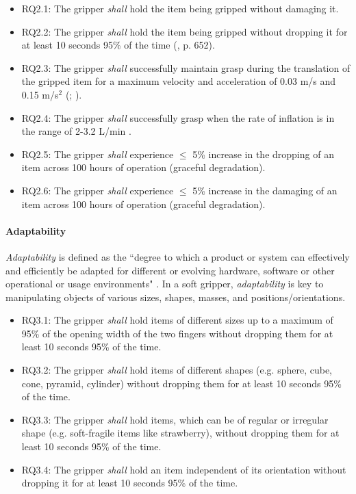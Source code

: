 \documentclass[letterpaper, 10 pt, conference]{ieeeconf}  %
\begin{document}
	\begin{itemize}
		\item RQ2.1: The gripper \emph{shall} hold the item being gripped without damaging it. 
		\item RQ2.2: The gripper \emph{shall} hold the item being gripped without dropping it for at least 10 seconds 95\% of the time (\cite{Sotiropoulos2018}, p. 652).
		\item RQ2.3: The gripper \emph{shall} successfully maintain grasp during the translation of the gripped item for a maximum velocity and acceleration of 0.03 m/s and 0.15 m/s$^2$ (\cite{Triantafyllou2019}; \cite{Cheng2021}).
		\item RQ2.4: The gripper \emph{shall} successfully grasp when the rate of inflation is in the range of 2-3.2 L/min \cite{DEWIN2022}.
		\item RQ2.5: The gripper \emph{shall} experience $\le$ 5\% increase in the dropping of an item across 100 hours of operation (graceful degradation). %
		\item RQ2.6: The gripper \emph{shall} experience $\le$ 5\% increase in the damaging of an item across 100 hours of operation (graceful degradation).  %
	\end{itemize}
	\paragraph{\textbf{Adaptability}} \label{adaptability}
	\emph{Adaptability} is defined as the ``degree to which a product or system can effectively and efficiently be adapted for different or evolving hardware, software or other operational or usage environments" \cite{ISO24765:2017}. In a soft gripper, \emph{adaptability} is key to manipulating objects of various sizes, shapes, masses, and positions/orientations. 
	\begin{itemize}
		\item RQ3.1: The gripper \emph{shall} hold items of different sizes up to a maximum of 95\% of the opening width of the two fingers without dropping them for at least 10 seconds 95\% of the time.
		\item RQ3.2: The gripper \emph{shall} hold items of different shapes (e.g. sphere, cube, cone, pyramid, cylinder) without dropping them for at least 10 seconds 95\% of the time.
		\item RQ3.3: The gripper \emph{shall} hold items, which can be of regular or irregular shape (e.g. soft-fragile items like strawberry), without dropping them for at least 10 seconds 95\% of the time.
		\item RQ3.4: The gripper \emph{shall} hold an item independent of its orientation without dropping it for at least 10 seconds 95\% of the time. 	  
	\end{itemize}
	
\end{document}
